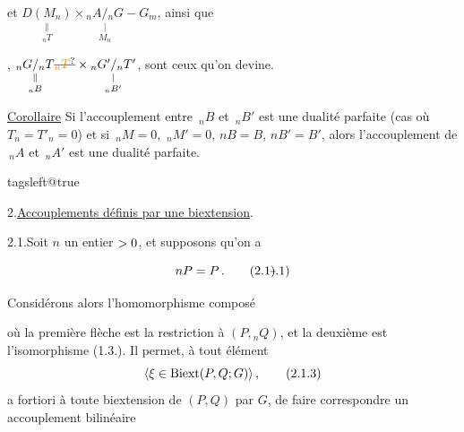 
et $\underset{{}_nT}{\underset{\Vert}{D(M_n)}}\times\underset{M_n}{\underset{|}{{}_nA/{}_nG}}\mathbin{-}G_m$, ainsi que

, $\underset{{}_nB}{\underset{\Vert}{{}_nG/{}_nT}}\deleted{\unsure{{}_nT}}\times\underset{{}_nB'}{\underset{|}{{}_nG'/{}_nT'}}$, sont ceux qu'on devine.

\uline{Corollaire} Si l'accouplement entre $\,{}_nB$ et $\,{}_nB'$ est une dualité parfaite (cas où $T_n=T'_n=0$)  et si $\,{}_nM=0$, $\,{}_nM'=0$, $nB=B$, $nB'=B'$, alors l'accouplement de $\,{}_nA$ et $\,{}_nA'$ est une dualité parfaite.

\begingroup\csname tagsleft@true\endcsname

2.\quad \uline{Accouplements définis par une biextension}.

2.1.\quad Soit $n$ un entier $>0$, et supposons qu'on a

\[nP=P\,.\tag*{(2.1\deleted{)}.1)}\]

Considérons alors l'homomorphisme composé


où la première flèche est la restriction à $(P,{}_nQ)$, et la deuxième est l'isomorphisme (1.3.). Il permet, à tout élément
\[\inserted{\handwritten{\xi\in}\mathrm{Biext}(P,Q;G)}\,,\tag*{(2.1.3)}\]
a fortiori à toute biextension de $(P,Q)$ par $G$, de faire correspondre un accouplement bilinéaire

